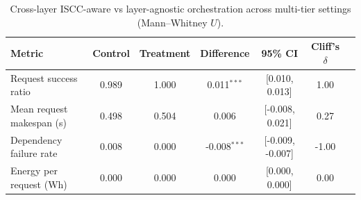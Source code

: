\begin{table}
\centering
\small
\caption{Cross-layer ISCC-aware vs layer-agnostic orchestration across multi-tier settings (Mann--Whitney $U$).}
\label{tab:p5-tests}
\begin{tabular}{lcccccc}
\toprule
Metric & Control & Treatment & Difference & 95\% CI & Cliff's $\delta$ \\
\midrule
Request success ratio & 0.989 & 1.000 & 0.011$^{***}$ & [0.010, 0.013] & 1.00 \\
Mean request makespan (s) & 0.498 & 0.504 & 0.006 & [-0.008, 0.021] & 0.27 \\
Dependency failure rate & 0.008 & 0.000 & -0.008$^{***}$ & [-0.009, -0.007] & -1.00 \\
Energy per request (Wh) & 0.000 & 0.000 & 0.000 & [0.000, 0.000] & 0.00 \\
\bottomrule
\end{tabular}
\par{}
\end{table}
